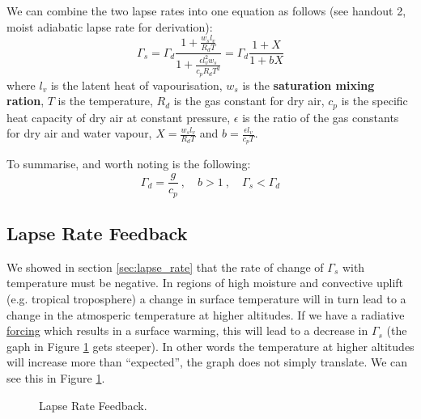 We can combine the two lapse rates into one equation as follows (see handout 2, moist adiabatic lapse rate for derivation):
$$
\Gamma_s = \Gamma_d \frac{1 + \frac{w_s l_v}{R_d T}}{1 + \frac{\epsilon l_v^2 w_s}{c_p R_d T^2}} = \Gamma_d \frac{1+X}{1+bX}
$$
where $l_v$ is the latent heat of vapourisation, $w_s$ is the \textbf{saturation mixing ration}, $T$ is the temperature,
$R_d$ is the gas constant for dry air, $c_p$ is the specific heat capacity of dry air at constant pressure, $\epsilon$ is
the ratio of the gas constants for dry air and water vapour, $X = \frac{w_sl_v}{R_dT}$ and $b = \frac{\epsilon l_v}{c_pT}$.

To summarise, and worth noting is the following:
$$
\boxed{\Gamma_d = \frac{g}{c_p}\ , \quad b > 1 \ , \quad \Gamma_s < \Gamma_d}
$$

\subsection{Lapse Rate Feedback}
\label{sec:lapse_rate_feedback}

We showed in section \ref{sec:lapse_rate} that the rate of change of $\Gamma_s$ with temperature must be negative. In 
regions of high moisture and convective uplift (e.g. tropical troposphere) a change in surface temperature will in turn
lead to a change in the atmosperic temperature at higher altitudes. If we have a radiative \hyperlink{glo:forcing}{forcing}
which results in a surface warming, this will lead to a decrease in $\Gamma_s$ (the gaph in Figure \ref{fig:lapse_rate_feedback}
gets steeper). In other words the temperature at higher altitudes will increase more than ``expected'', the graph does
not simply translate. We can see this in Figure \ref{fig:lapse_rate_feedback}.

\begin{figure}
    \centering
    \caption{Lapse Rate Feedback.}
    \label{fig:lapse_rate_feedback}
\end{figure}

